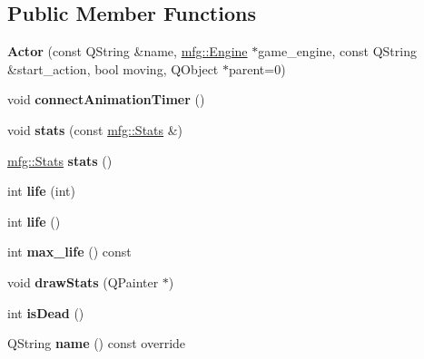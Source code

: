 \subsection*{Public Member Functions}
\begin{DoxyCompactItemize}
\item 
\mbox{\label{class_actor_a02fdbff16837e9f9cc74ad8ba03440e4}} 
{\bfseries Actor} (const Q\+String \&name, \hyperlink{classmfg_1_1_engine}{mfg\+::\+Engine} $\ast$game\+\_\+engine, const Q\+String \&start\+\_\+action, bool moving, Q\+Object $\ast$parent=0)
\item 
\mbox{\label{class_actor_a192c8c34a9291eeab43db2a73315f9ca}} 
void {\bfseries connect\+Animation\+Timer} ()
\item 
\mbox{\label{class_actor_a50df20e352d71fe8a4af98162f104ece}} 
void {\bfseries stats} (const \hyperlink{structmfg_1_1_stats}{mfg\+::\+Stats} \&)
\item 
\mbox{\label{class_actor_a68a028452156d20a088348b6e558820c}} 
\hyperlink{structmfg_1_1_stats}{mfg\+::\+Stats} {\bfseries stats} ()
\item 
\mbox{\label{class_actor_aed5947d0b4e1dca68876f3a7e0f1d99a}} 
int {\bfseries life} (int)
\item 
\mbox{\label{class_actor_a5b26f0bc4b153cd35f45b568c1bf8844}} 
int {\bfseries life} ()
\item 
\mbox{\label{class_actor_af6e1b33cb21b2ae9d70d230fdaa6ac24}} 
int {\bfseries max\+\_\+life} () const
\item 
\mbox{\label{class_actor_a3e46f2e658f418e4990ed8f431794a1d}} 
void {\bfseries draw\+Stats} (Q\+Painter $\ast$)
\item 
\mbox{\label{class_actor_aa8548f009a8c9dad4f5d2ddb77b28e50}} 
int {\bfseries is\+Dead} ()
\item 
\mbox{\label{class_actor_af0d6c18e2d77b91a45538a9db41b2744}} 
Q\+String {\bfseries name} () const override
\item 
\mbox{\label{class_actor_a277f9d95d9198fd2f8623b49b3a33326}} 

\end{DoxyCompactItemize}
